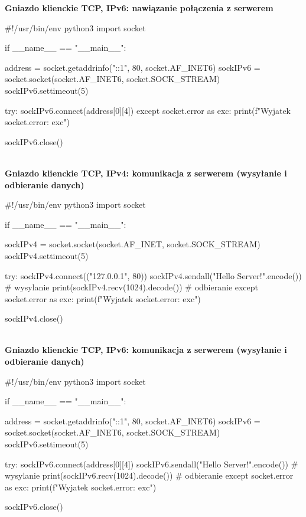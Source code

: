 \noindent \textbf{Gniazdo klienckie TCP, IPv6: nawiązanie połączenia z serwerem}

\begin{code}
#!/usr/bin/env python3
import socket

if __name__ == "__main__":

    address = socket.getaddrinfo("::1", 80, socket.AF_INET6)
    sockIPv6 = socket.socket(socket.AF_INET6, socket.SOCK_STREAM)
    sockIPv6.settimeout(5)

    try:
        sockIPv6.connect(address[0][4])
    except socket.error as exc:
        print(f"Wyjatek socket.error: {exc}")

    sockIPv6.close()
\end{code}\mbox{}\\

\noindent \textbf{Gniazdo klienckie TCP, IPv4: komunikacja z serwerem (wysyłanie i odbieranie danych)}

\begin{code}
#!/usr/bin/env python3
import socket

if __name__ == "__main__":

    sockIPv4 = socket.socket(socket.AF_INET, socket.SOCK_STREAM)
    sockIPv4.settimeout(5)

    try:
        sockIPv4.connect(("127.0.0.1", 80))
        sockIPv4.sendall("Hello Server!".encode())	# wysylanie
        print(sockIPv4.recv(1024).decode())								# odbieranie
    except socket.error as exc:
        print(f"Wyjatek socket.error: {exc}")

    sockIPv4.close()
\end{code}\mbox{}\\

\newpage
\noindent \textbf{Gniazdo klienckie TCP, IPv6: komunikacja z serwerem (wysyłanie i odbieranie danych)}

\begin{code}
#!/usr/bin/env python3
import socket

if __name__ == "__main__":

    address = socket.getaddrinfo("::1", 80, socket.AF_INET6)
    sockIPv6 = socket.socket(socket.AF_INET6, socket.SOCK_STREAM)
    sockIPv6.settimeout(5)

    try:
        sockIPv6.connect(address[0][4])
        sockIPv6.sendall("Hello Server!".encode())	# wysylanie
        print(sockIPv6.recv(1024).decode())								# odbieranie
    except socket.error as exc:
        print(f"Wyjatek socket.error: {exc}")

    sockIPv6.close()
\end{code}\mbox{}\\

